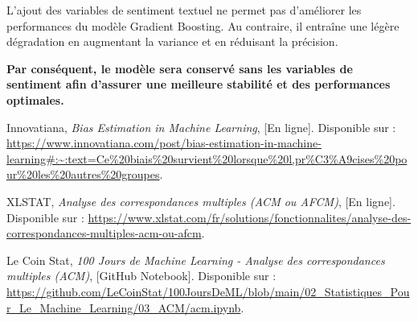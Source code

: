 \documentclass[a4paper,12pt]{article}
\begin{document}
\bigskip
 
L'ajout des variables de sentiment textuel ne permet pas d'améliorer les performances du modèle Gradient Boosting. Au contraire, il entraîne une légère dégradation en augmentant la variance et en réduisant la précision.
 
\textbf{Par conséquent, le modèle sera conservé sans les variables de sentiment afin d'assurer une meilleure stabilité et des performances optimales.}

\begin{thebibliography}{9}

    Innovatiana, 
    \emph{Bias Estimation in Machine Learning}, 
    [En ligne]. Disponible sur : \url{https://www.innovatiana.com/post/bias-estimation-in-machine-learning#:~:text=Ce%20biais%20survient%20lorsque%20l,pr%C3%A9cises%20pour%20les%20autres%20groupes}. 
    
    XLSTAT,
    \emph{Analyse des correspondances multiples (ACM ou AFCM)}, 
    [En ligne]. Disponible sur : \url{https://www.xlstat.com/fr/solutions/fonctionnalites/analyse-des-correspondances-multiples-acm-ou-afcm}. 
    
    Le Coin Stat,
    \emph{100 Jours de Machine Learning - Analyse des correspondances multiples (ACM)}, 
    [GitHub Notebook]. Disponible sur : \url{https://github.com/LeCoinStat/100JoursDeML/blob/main/02_Statistiques_Pour_Le_Machine_Learning/03_ACM/acm.ipynb}. 
    
    \end{thebibliography}
    
    
 
\end{document}
